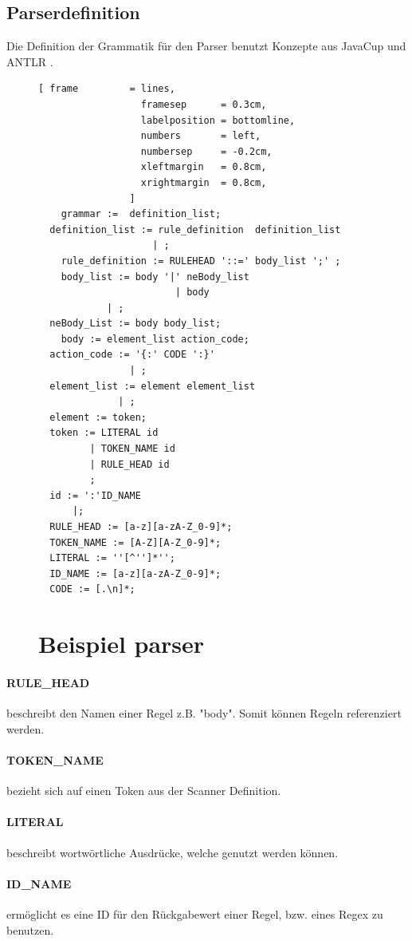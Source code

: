 \subsection{Parserdefinition}
Die Definition der Grammatik für den Parser benutzt Konzepte aus JavaCup und ANTLR .
\begin{figure}[!ht]
\begin{Verbatim}[ frame         = lines, 
                  framesep      = 0.3cm, 
                  labelposition = bottomline,
                  numbers       = left,
                  numbersep     = -0.2cm,
                  xleftmargin   = 0.8cm,
                  xrightmargin  = 0.8cm,
                ]
	grammar :=  definition_list;
  definition_list := rule_definition  definition_list
                    | ;
	rule_definition := RULEHEAD '::=' body_list ';' ;
	body_list := body '|' neBody_list
						| body
            | ;
  neBody_List := body body_list;
	body := element_list action_code;
  action_code := '{:' CODE ':}'
                | ;
  element_list := element element_list
              | ;
  element := token;
  token := LITERAL id
         | TOKEN_NAME id
         | RULE_HEAD id
         ;
  id := ':'ID_NAME
      |;
  RULE_HEAD := [a-z][a-zA-Z_0-9]*;
  TOKEN_NAME := [A-Z][A-Z_0-9]*;
  LITERAL := ''[^'']*'';
  ID_NAME := [a-z][a-zA-Z_0-9]*;
  CODE := [.\n]*;
\end{Verbatim}
\section{Beispiel parser}
\label{fig:example_grammer}
\end{figure}
\paragraph{RULE\_HEAD} beschreibt den Namen einer Regel z.B. "body". Somit können Regeln referenziert werden. 
\paragraph{TOKEN\_NAME} bezieht sich auf einen Token aus der Scanner Definition.
\paragraph{LITERAL}  beschreibt wortwörtliche Ausdrücke, welche genutzt werden können. 
\paragraph{ID\_NAME} ermöglicht es eine ID für den Rückgabewert einer Regel, bzw. eines Regex zu benutzen.

